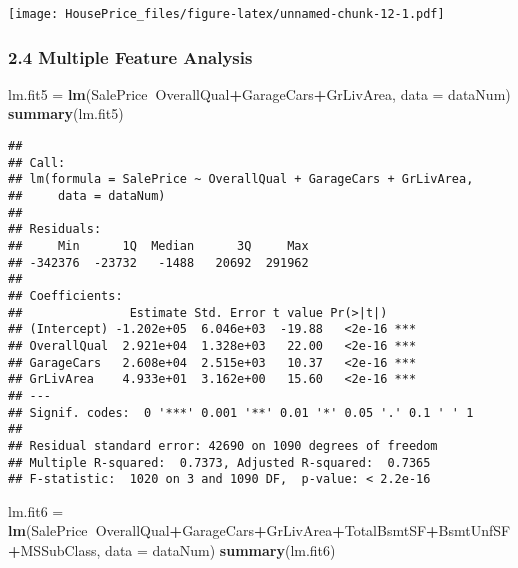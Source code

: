 \documentclass[]{article}
\newenvironment{Shaded}{\begin{snugshade}}{\end{snugshade}}
\newcommand{\KeywordTok}[1]{\textcolor[rgb]{0.13,0.29,0.53}{\textbf{#1}}}
\newcommand{\DataTypeTok}[1]{\textcolor[rgb]{0.13,0.29,0.53}{#1}}
\newcommand{\DecValTok}[1]{\textcolor[rgb]{0.00,0.00,0.81}{#1}}
\newcommand{\StringTok}[1]{\textcolor[rgb]{0.31,0.60,0.02}{#1}}
\newcommand{\OperatorTok}[1]{\textcolor[rgb]{0.81,0.36,0.00}{\textbf{#1}}}
\newcommand{\NormalTok}[1]{#1}
\begin{document}
\begin{Shaded}
\end{Shaded}

\texttt{[image: HousePrice\_files/figure-latex/unnamed-chunk-12-1.pdf]}

\subsubsection{2.4 Multiple Feature
Analysis}\label{multiple-feature-analysis}

\begin{Shaded}
\begin{Highlighting}[]
\NormalTok{lm.fit5 =}\StringTok{ }\KeywordTok{lm}\NormalTok{(SalePrice}\OperatorTok{~}\NormalTok{OverallQual}\OperatorTok{+}\NormalTok{GarageCars}\OperatorTok{+}\NormalTok{GrLivArea, }\DataTypeTok{data =}\NormalTok{ dataNum)}
\KeywordTok{summary}\NormalTok{(lm.fit5)}
\end{Highlighting}
\end{Shaded}

\begin{verbatim}
## 
## Call:
## lm(formula = SalePrice ~ OverallQual + GarageCars + GrLivArea, 
##     data = dataNum)
## 
## Residuals:
##     Min      1Q  Median      3Q     Max 
## -342376  -23732   -1488   20692  291962 
## 
## Coefficients:
##               Estimate Std. Error t value Pr(>|t|)    
## (Intercept) -1.202e+05  6.046e+03  -19.88   <2e-16 ***
## OverallQual  2.921e+04  1.328e+03   22.00   <2e-16 ***
## GarageCars   2.608e+04  2.515e+03   10.37   <2e-16 ***
## GrLivArea    4.933e+01  3.162e+00   15.60   <2e-16 ***
## ---
## Signif. codes:  0 '***' 0.001 '**' 0.01 '*' 0.05 '.' 0.1 ' ' 1
## 
## Residual standard error: 42690 on 1090 degrees of freedom
## Multiple R-squared:  0.7373, Adjusted R-squared:  0.7365 
## F-statistic:  1020 on 3 and 1090 DF,  p-value: < 2.2e-16
\end{verbatim}

\begin{Shaded}
\begin{Highlighting}[]
\NormalTok{lm.fit6 =}\StringTok{ }\KeywordTok{lm}\NormalTok{(SalePrice}\OperatorTok{~}\NormalTok{OverallQual}\OperatorTok{+}\NormalTok{GarageCars}\OperatorTok{+}\NormalTok{GrLivArea}\OperatorTok{+}\NormalTok{TotalBsmtSF}\OperatorTok{+}\NormalTok{BsmtUnfSF}\OperatorTok{+}\NormalTok{MSSubClass, }\DataTypeTok{data =}\NormalTok{ dataNum)}
\KeywordTok{summary}\NormalTok{(lm.fit6)}
\end{Highlighting}
\end{Shaded}
\end{document}
